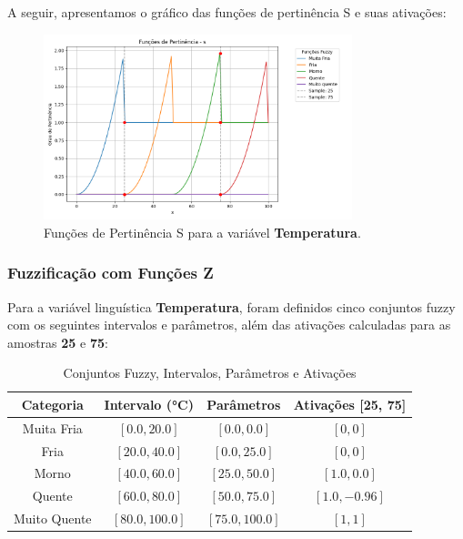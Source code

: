 \documentclass[a4paper,12pt]{article}
\begin{document}
A seguir, apresentamos o gráfico das funções de pertinência S e suas ativações:

\begin{figure}[H]
    \centering
    \includegraphics[width=0.8\textwidth]{img/funções_de_pertinência_s_fuzzificado.png}
    \caption{Funções de Pertinência S para a variável \textbf{Temperatura}.}
\end{figure}

\subsubsection{Fuzzificação com Funções Z}

Para a variável linguística \textbf{Temperatura}, foram definidos cinco conjuntos fuzzy com os seguintes intervalos e parâmetros, além das ativações calculadas para as amostras \textbf{25} e \textbf{75}:

\begin{table}[H]
\centering
\caption{Conjuntos Fuzzy, Intervalos, Parâmetros e Ativações}
\begin{tabular}{|c|c|c|c|}
\hline
\textbf{Categoria}    & \textbf{Intervalo (°C)} & \textbf{Parâmetros}       & \textbf{Ativações [25, 75]} \\ \hline
Muita Fria            & $[0.0, 20.0]$          & $[0.0, 0.0]$              & $[0, 0]$                   \\ \hline
Fria                  & $[20.0, 40.0]$         & $[0.0, 25.0]$             & $[0, 0]$                   \\ \hline
Morno                 & $[40.0, 60.0]$         & $[25.0, 50.0]$            & $[1.0, 0.0]$               \\ \hline
Quente                & $[60.0, 80.0]$         & $[50.0, 75.0]$            & $[1.0, -0.96]$             \\ \hline
Muito Quente          & $[80.0, 100.0]$        & $[75.0, 100.0]$           & $[1, 1]$                   \\ \hline
\end{tabular}
\end{table}
\end{document}
